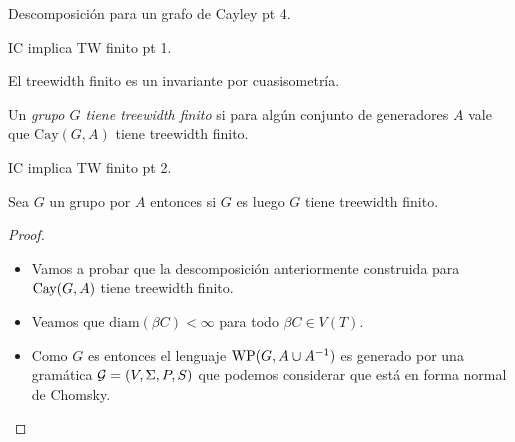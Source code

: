 \documentclass[aspectratio=169, 11pt]{beamer}
\begin{document}
	\begin{frame}[fragile]{Descomposición para un grafo de Cayley pt 4.}
		
		
	\end{frame}
	
	\begin{frame}[fragile]{IC implica TW finito pt 1.}
		
		\begin{prop}
			El treewidth finito es un invariante por cuasisometría.
		\end{prop}
		
		Un \emph{grupo $G$ \fg tiene treewidth finito} si para algún conjunto de generadores $A$ vale que $\text{Cay}(G,A)$ tiene treewidth finito.
			
	\end{frame}

	\begin{frame}[fragile]{IC implica TW finito pt 2.}
		\begin{teo} 
			Sea $G$ un grupo \fg por $A$ entonces si $G$ es \ic{} luego $G$ tiene treewidth finito.
		\end{teo}
		
		\begin{proof}
			\begin{itemize}
				\item 
					Vamos a probar que la descomposición anteriormente construida para $\text{Cay}(G,A)$ tiene treewidth finito.
					
				\item 
					Veamos que $\text{diam}(\beta C) < \infty$ para todo $\beta C \in V(T) $.
					
				\item 
					Como $G$ es \ic{} entonces el lenguaje $\text{WP}(G, A \cup A^{-1})$ es generado por una gramática ${\cal G} = (V, \Sigma, P, S)$ que podemos considerar que está en forma normal de Chomsky.
					
				
			\end{itemize}
		\end{proof}
	\end{frame}
\end{document}
